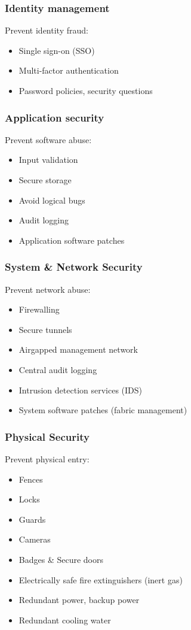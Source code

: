 \documentclass{beamer}
\begin{document}
\begin{frame}
    \frametitle{Identity management}
    Prevent identity fraud:
    \begin{itemize}
      \item Single sign-on (SSO) %
      \item Multi-factor authentication
      \item Password policies, security questions
    \end{itemize}
\end{frame}

\begin{frame}
    \frametitle{Application security}
    Prevent software abuse:
    \begin{itemize}
      \item Input validation
      \item Secure storage
      \item Avoid logical bugs
      \item Audit logging
      \item Application software patches
    \end{itemize}
\end{frame}

\begin{frame}
    \frametitle{System \& Network Security}
    Prevent network abuse:
    \begin{itemize}
      \item Firewalling
      \item Secure tunnels %
      \item Airgapped management network
      \item Central audit logging
      \item Intrusion detection services (IDS)
      \item System software patches (fabric management)
    \end{itemize}
\end{frame}

\begin{frame}
    \frametitle{Physical Security}
    Prevent physical entry:
    \begin{itemize}
      \item Fences
      \item Locks
      \item Guards
      \item Cameras
      \item Badges \& Secure doors
      \item Electrically safe fire extinguishers (inert gas)
      \item Redundant power, backup power
      \item Redundant cooling water
    \end{itemize}
\end{frame}
\end{document}

